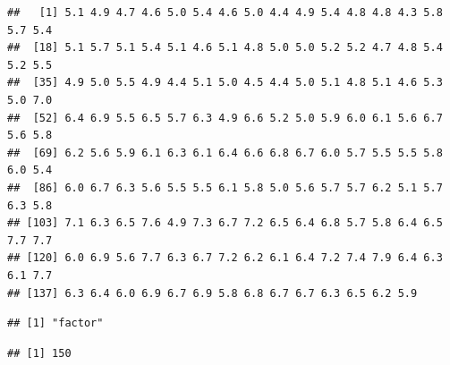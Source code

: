 \documentclass[]{article}
\newenvironment{Shaded}{\begin{snugshade}}{\end{snugshade}}
\newcommand{\CommentTok}[1]{\textcolor[rgb]{0.56,0.35,0.01}{\textit{#1}}}
\newcommand{\KeywordTok}[1]{\textcolor[rgb]{0.13,0.29,0.53}{\textbf{#1}}}
\newcommand{\NormalTok}[1]{#1}
\newcommand{\OperatorTok}[1]{\textcolor[rgb]{0.81,0.36,0.00}{\textbf{#1}}}
\begin{document}
\begin{Shaded}
\end{Shaded}

\begin{verbatim}
##   [1] 5.1 4.9 4.7 4.6 5.0 5.4 4.6 5.0 4.4 4.9 5.4 4.8 4.8 4.3 5.8 5.7 5.4
##  [18] 5.1 5.7 5.1 5.4 5.1 4.6 5.1 4.8 5.0 5.0 5.2 5.2 4.7 4.8 5.4 5.2 5.5
##  [35] 4.9 5.0 5.5 4.9 4.4 5.1 5.0 4.5 4.4 5.0 5.1 4.8 5.1 4.6 5.3 5.0 7.0
##  [52] 6.4 6.9 5.5 6.5 5.7 6.3 4.9 6.6 5.2 5.0 5.9 6.0 6.1 5.6 6.7 5.6 5.8
##  [69] 6.2 5.6 5.9 6.1 6.3 6.1 6.4 6.6 6.8 6.7 6.0 5.7 5.5 5.5 5.8 6.0 5.4
##  [86] 6.0 6.7 6.3 5.6 5.5 5.5 6.1 5.8 5.0 5.6 5.7 5.7 6.2 5.1 5.7 6.3 5.8
## [103] 7.1 6.3 6.5 7.6 4.9 7.3 6.7 7.2 6.5 6.4 6.8 5.7 5.8 6.4 6.5 7.7 7.7
## [120] 6.0 6.9 5.6 7.7 6.3 6.7 7.2 6.2 6.1 6.4 7.2 7.4 7.9 6.4 6.3 6.1 7.7
## [137] 6.3 6.4 6.0 6.9 6.7 6.9 5.8 6.8 6.7 6.7 6.3 6.5 6.2 5.9
\end{verbatim}

\begin{Shaded}
\end{Shaded}

\begin{verbatim}
## [1] "factor"
\end{verbatim}

\begin{Shaded}
\end{Shaded}

\begin{verbatim}
## [1] 150
\end{verbatim}

\begin{Shaded}
\end{Shaded}
\end{document}
